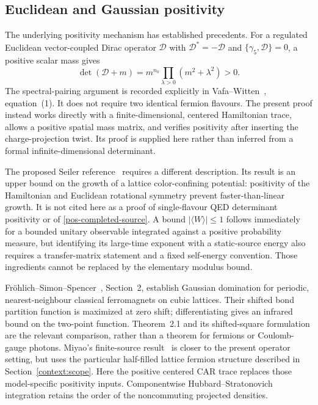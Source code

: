 \subsection{Euclidean and Gaussian positivity}

The underlying positivity mechanism has established precedents.
For a regulated Euclidean vector-coupled Dirac operator $\mathcal D$
with $\mathcal D^*=-\mathcal D$ and
$\{\gamma_5,\mathcal D\}=0$, a positive scalar mass gives
\[
 \det(\mathcal D+m)=m^{n_0}
          \prod_{\lambda>0}(m^2+\lambda^2)>0.
\]
The spectral-pairing argument is recorded explicitly in
Vafa--Witten~\cite{VafaWitten}, equation~(1).  It does not require
two identical fermion flavours.  The present proof instead works
directly with a finite-dimensional, centered Hamiltonian trace,
allows a positive spatial mass matrix, and verifies positivity after
inserting the charge-projection twist.  Its proof is supplied here
rather than inferred from a formal infinite-dimensional determinant.

The proposed Seiler reference~\cite{Seiler} requires a different
description.  Its result is an upper bound on the growth of a
lattice color-confining potential: positivity of the Hamiltonian and
Euclidean rotational symmetry prevent faster-than-linear growth.
It is not cited here as a proof of single-flavour QED determinant
positivity or of \eqref{pos-completed-source}.  A bound
$|\langle W\rangle|\leq1$ follows immediately for a bounded unitary
observable integrated against a positive probability measure, but
identifying its large-time exponent with a static-source energy also
requires a transfer-matrix statement and a fixed self-energy convention.
Those ingredients cannot be replaced by the elementary modulus bound.

Fr\"ohlich--Simon--Spencer~\cite{FSS}, Section~2, establish Gaussian
domination for periodic, nearest-neighbour classical ferromagnets on
cubic lattices.  Their shifted bond partition function is maximized
at zero shift; differentiating gives an infrared bound on the two-point
function.  Theorem~2.1 and its shifted-square formulation are the
relevant comparison, rather than a theorem for fermions or Coulomb-gauge
photons.  Miyao's finite-source result~\cite{Miyao} is closer to the
present operator setting, but uses the particular half-filled lattice
fermion structure described in Section~\ref{context:scope}.  Here the
positive centered CAR trace replaces those model-specific positivity
inputs.  Componentwise Hubbard--Stratonovich integration retains the
order of the noncommuting projected densities.

